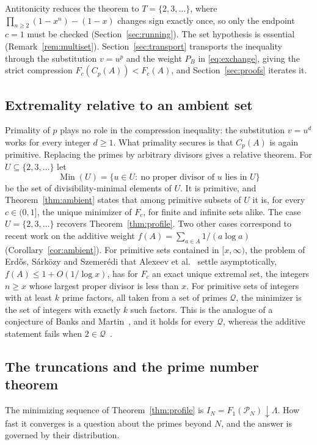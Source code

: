 \documentclass[11pt]{article}
\theoremstyle{remark}
\newcommand{\Prm}{\mathcal{P}}
\begin{document}
Antitonicity reduces the theorem to $T=\{2,3,\dots\}$, where
$\prod_{n\ge2}(1-x^n)-(1-x)$ changes sign exactly once, so only the
endpoint $c=1$ must be checked (Section~\ref{sec:running}). The set
hypothesis is essential (Remark~\ref{rem:multiset}).
Section~\ref{sec:transport} transports the inequality through the
substitution $v=u^p$ and the weight $P_B$ in \eqref{eq:exchange},
giving the strict compression $F_c(C_p(A))<F_c(A)$, and
Section~\ref{sec:proofs} iterates it.

\subsection{Extremality relative to an ambient set}
Primality of $p$ plays no role in the compression inequality: the
substitution $v=u^d$ works for every integer $d\ge1$. What primality
secures is that $C_p(A)$ is again primitive. Replacing the primes by
arbitrary divisors gives a relative theorem. For
$U\subseteq\{2,3,\dots\}$ let
\[
  \operatorname{Min}(U)=\{u\in U:\ \text{no proper divisor of $u$ lies in $U$}\}
\]
be the set of divisibility-minimal elements of $U$. It is primitive, and
Theorem~\ref{thm:ambient} states that among primitive subsets of $U$ it is,
for every $c\in(0,1]$, the unique minimizer of $F_c$, for finite and
infinite sets alike. The case $U=\{2,3,\dots\}$ recovers
Theorem~\ref{thm:profile}. Two other cases correspond to recent work on
the additive weight $f(A)=\sum_{a\in A}1/(a\log a)$
(Corollary~\ref{cor:ambient}). For primitive sets contained in
$[x,\infty)$, the problem of Erd\H{o}s, S\'ark\"ozy and Szemer\'edi that
Alexeev et al.~\cite{Alexeev2026} settle asymptotically,
$f(A)\le1+O(1/\log x)$, has for $F_c$ an exact unique extremal set, the
integers $n\ge x$ whose largest proper divisor is less than $x$. For
primitive sets of integers with at least $k$ prime factors, all taken
from a set of primes $\mathcal Q$, the minimizer is the set of integers
with exactly $k$ such factors. This is the analogue of a conjecture of
Banks and Martin~\cite{BanksMartin2013}, and it holds for every
$\mathcal Q$, whereas the additive statement fails when
$2\in\mathcal Q$~\cite{Alexeev2026}.

\subsection{The truncations and the prime number theorem}
The minimizing sequence of Theorem~\ref{thm:profile} is
$I_N=F_1(\Prm_N)\downarrow\Lambda$. How fast it converges is a question
about the primes beyond $N$, and the answer is governed by their
distribution.
\end{document}

